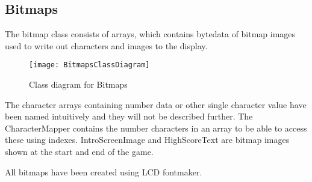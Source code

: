 \subsection{Bitmaps}
	The bitmap class consists of arrays, which contains bytedata of bitmap images used to write out characters and images to the display. 
	
	\begin{figure}[H]
		\texttt{[image: BitmapsClassDiagram]}
		\centering
		\caption{Class diagram for Bitmaps}
		\label{fig:classBitmap}
	\end{figure}
	
	The character arrays containing number data or other single character value have been named intuitively and they will not be described further. The CharacterMapper contains the number characters in an array to be able to access these using indexes. IntroScreenImage and HighScoreText are bitmap images shown at the start and end of the game.
	
	All bitmaps have been created using LCD fontmaker. 